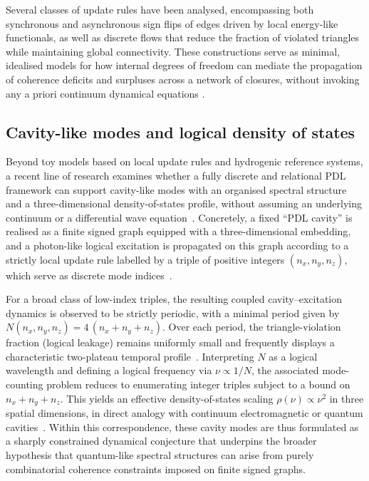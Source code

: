 \documentclass{article}
\begin{document}
Several classes of update rules have been analysed, encompassing both synchronous and asynchronous sign flips of edges driven by local energy‑like functionals, as well as discrete flows that reduce the fraction of violated triangles while maintaining global connectivity. These constructions serve as minimal, idealised models for how internal degrees of freedom can mediate the propagation of coherence deficits and surpluses across a network of closures, without invoking any a priori continuum dynamical equations \citep{Coherence_Leakage_18_2026}.

\subsection{Cavity-like modes and logical density of states}
\label{subsec:cavity_modes}

Beyond toy models based on local update rules and hydrogenic reference systems, a recent line of research examines whether a fully discrete and relational PDL framework can support cavity-like modes with an organised spectral structure and a three-dimensional density-of-states profile, without assuming an underlying continuum or a differential wave equation~\citep{Effective_Fields_PDL_2026,PDLCavityModes2026}. Concretely, a fixed “PDL cavity” is realised as a finite signed graph equipped with a three-dimensional embedding, and a photon-like logical excitation is propagated on this graph according to a strictly local update rule labelled by a triple of positive integers $(n_x,n_y,n_z)$, which serve as discrete mode indices~\citep{PDLCavityModes2026}.

For a broad class of low-index triples, the resulting coupled cavity–excitation dynamics is observed to be strictly periodic, with a minimal period given by $N(n_x,n_y,n_z)=4\,(n_x+n_y+n_z)$. Over each period, the triangle-violation fraction (logical leakage) remains uniformly small and frequently displays a characteristic two-plateau temporal profile~\citep{PDLCavityModes2026}. Interpreting $N$ as a logical wavelength and defining a logical frequency via $\nu\propto 1/N$, the associated mode-counting problem reduces to enumerating integer triples subject to a bound on $n_x+n_y+n_z$. This yields an effective density-of-states scaling $\rho(\nu)\propto \nu^2$ in three spatial dimensions, in direct analogy with continuum electromagnetic or quantum cavities~\citep{PDLCavityModes2026}. Within this correspondence, these cavity modes are thus formulated as a sharply constrained dynamical conjecture that underpins the broader hypothesis that quantum-like spectral structures can arise from purely combinatorial coherence constraints imposed on finite signed graphs.
\end{document}

